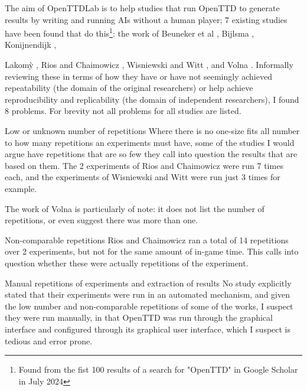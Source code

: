 \documentclass[logo,msc,dsti]{infthesis}    %
\begin{document}
The aim of OpenTTDLab is to help studies that run OpenTTD to generate results by writing and running AIs without a human player; 7 existing studies have been found that do this\footnote{Found from the fist 100 results of a search for "OpenTTD" in Google Scholar in July 2024}: the work of Beuneker et al \cite{beuneker2019autonomous}, Bijlsma \cite{bijlsma2014evolving}, Konijnendijk \cite{konijnendijk2015mcts}, {Lakom{\`y} \cite{lakomy2020railroad}, Rios and Chaimowicz \cite{rios2009trains}, Wisniewski and Witt \cite{wisniewski2011artificial}, and Volna \cite{volna2017fuzzy}. Informally reviewing these in terms of how they have or have not seemingly achieved repeatability (the domain of the original researchers) or help achieve reproducibility and replicability (the domain of independent researchers), I found 8 problems. For brevity not all problems for all studies are listed.

\begin{enumerate}
\begin{descitem}{Low or unknown number of repetitions}
Where there is no one-size fits all number to how many repetitions an experiments must have, some of the studies I would argue have repetitions that are so few they call into question the results that are based on them. The 2 experiments of Rios and Chaimowicz \cite{rios2009trains} were run 7 times each, and the experiments of Wisniewski and Witt \cite{wisniewski2011artificial} were run just 3 times for example.

The work of Volna \cite{volna2017fuzzy} is particularly of note: it does not list the number of repetitions, or even suggest there was more than one.
\end{descitem}
\begin{descitem}{Non-comparable repetitions}
Rios and Chaimowicz \cite{rios2009trains} ran a total of 14 repetitions over 2 experiments, but not for the same amount of in-game time. This calls into question whether these were actually repetitions of the experiment.
\end{descitem}
\begin{descitem}{Manual repetitions of experiments and extraction of results}
No study explicitly stated that their experiments were run in an automated mechanism, and given the low number and non-comparable repetitions of some of the works, I suspect they were run manually, in that OpenTTD was run through the graphical interface and configured through its graphical user interface, which I suspect is tedious and error prone.


\end{descitem}
\end{enumerate}}
\end{document}
